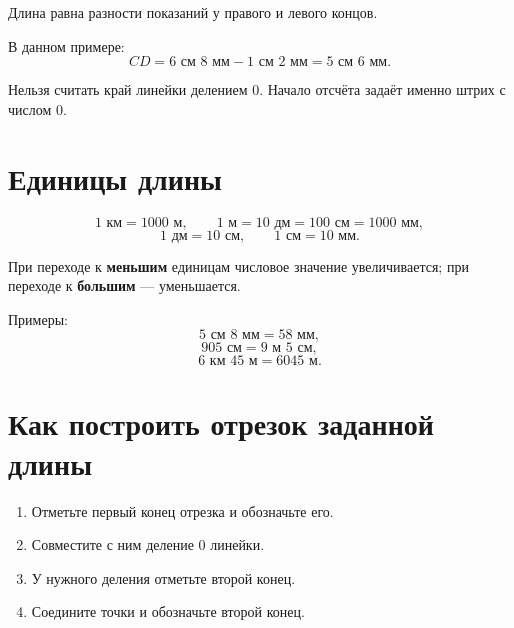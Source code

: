 \correctmeasurementfigure

\begin{notebox}
  Длина равна разности показаний у правого и левого концов.
\end{notebox}

\shiftedmeasurementfigure

В данном примере:
\[
  CD=6\text{ см }8\text{ мм}-1\text{ см }2\text{ мм}
     =5\text{ см }6\text{ мм}.
\]

\begin{warningbox}
  Нельзя считать край линейки делением \(0\). Начало отсчёта задаёт именно
  штрих с числом \(0\).
\end{warningbox}

\section{Единицы длины}

\unitsladderfigure

\[
  1\text{ км}=1000\text{ м},\qquad
  1\text{ м}=10\text{ дм}=100\text{ см}=1000\text{ мм},
\]
\[
  1\text{ дм}=10\text{ см},\qquad
  1\text{ см}=10\text{ мм}.
\]

\begin{propertybox}
  При переходе к \textbf{меньшим} единицам числовое значение увеличивается;
  при переходе к \textbf{большим} — уменьшается.
\end{propertybox}

Примеры:
\[
  5\text{ см }8\text{ мм}=58\text{ мм},
\]
\[
  905\text{ см}=9\text{ м }5\text{ см},
\]
\[
  6\text{ км }45\text{ м}=6045\text{ м}.
\]

\section{Как построить отрезок заданной длины}

\constructionalgorithmfigure

\begin{propertybox}
  \begin{enumerate}
    \item Отметьте первый конец отрезка и обозначьте его.
    \item Совместите с ним деление \(0\) линейки.
    \item У нужного деления отметьте второй конец.
    \item Соедините точки и обозначьте второй конец.
  \end{enumerate}
\end{propertybox}

